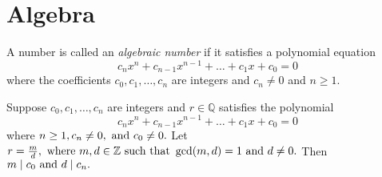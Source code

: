\documentclass[../main.tex]{subfiles}
\begin{document}
\section{Algebra}












\begin{definition}\label{def:algebraic number}
A number is called an \textit{algebraic number} if it satisfies a polynomial equation
\[
c_nx^n + c_{n-1}x^{n-1} + \dotsc + c_1x + c_0 = 0
\]
where the coefficients \(c_0, c_1, \dots, c_n\) are integers and \(c_n \neq 0\) and \(n \geq 1.\)
\end{definition}























\begin{theorem}\label{thm:rational zeros theorem}
Suppose \(c_0, c_1, \dots , c_n \) are integers and \( r \in \mathbb{Q}\) satisfies the polynomial
\[
c_nx^n + c_{n-1}x^{n-1} + \dotsc + c_1x + c_0 = 0
\]
where \(n \geq 1, c_n \neq 0, \textnormal{ and } c_0 \neq 0.\) Let \(r = \frac{m}{d}, \textnormal{ where } m, d \in \mathbb{Z} \textnormal{ such that } \gcd(m,d) = 1 \textnormal{ and } d \neq 0.\) Then \(m\mid c_0 \textnormal{ and } d \mid c_n.\) 
\end{theorem}
\end{document}
